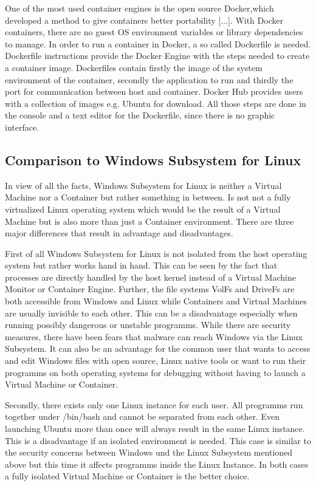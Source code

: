 \documentclass[utf8,biblatex, ngerman, english]{lni}
\begin{document}
One of the most used container engines is the open source Docker,\glqq [...] which developed a method to give containers better portability [...]. With Docker containers, there are no guest OS environment variables or library dependencies to manage. \glqq \cite{cz} In order to run a container in Docker, a so called Dockerfile is needed. \glqq Dockerfile instructions provide the Docker Engine with the steps needed to create a container image.\glqq \cite{DW16} Dockerfiles contain firstly the image of the system environment of the container, secondly the application to run and thirdly the port for communication between host and container. Docker Hub provides users with a collection of images e.g. Ubuntu for download. All those steps are done in the console and a text editor for the Dockerfile, since there is no graphic interface.

\subsection{Comparison to Windows Subsystem for Linux}

In view of all the facts, Windows Subsystem for Linux is neither a Virtual Machine nor a Container but rather something in between. Is not not a fully virtualized Linux operating system which would be the result of a Virtual Machine but is also more than just a Container environment. There are three major differences that result in advantage and disadvantages. 

First of all Windows Subsystem for Linux is not isolated from the host operating system but rather works hand in hand. This can be seen by the fact that processes are directly handled by the host kernel instead of a Virtual Machine Monitor or Container Engine. Further, the file systems VolFs and DriveFs are both accessible from Windows and Linux while Containers and Virtual Machines are usually invisible to each other. This can be a disadvantage especially when running possibly dangerous or unstable programms. While there are security measures, there have been fears that malware can reach Windows via the Linux Subsystem. \cite{Wh17} It can also be an advantage for the common user that wants to access and edit Windows files with open source, Linux native tools or want to run their programms on both operating systems for debugging without having to launch a Virtual Machine or Container.

Secondly, there exists only one Linux instance for each user. All programms run together under /bin/bash and cannot be separated from each other. Even launching Ubuntu more than once will always result in the same Linux instance.\cite{WSL16} This is a disadvantage if an isolated environment is needed. This case is similar to the security concerns between Windows und the Linux Subsystem mentioned above but this time it affects programms inside the Linux Instance. In both cases a fully isolated Virtual Machine or 
Container is the better choice.
\end{document}
